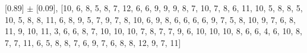 [0.89] $\pm$ [0.09], [10, 6, 8, 5, 8, 7, 12, 6, 6, 9, 9, 9, 8, 7, 10, 7, 8, 6, 11, 10, 5, 8, 8, 5, 10, 5, 8, 8, 11, 6, 8, 9, 5, 7, 9, 7, 8, 10, 6, 9, 8, 6, 6, 6, 6, 9, 7, 5, 8, 10, 9, 7, 6, 8, 11, 9, 10, 11, 3, 6, 6, 8, 7, 10, 10, 10, 7, 8, 7, 7, 9, 6, 10, 10, 10, 8, 6, 6, 4, 6, 10, 8, 7, 7, 11, 6, 5, 8, 8, 7, 6, 9, 7, 6, 8, 8, 12, 9, 7, 11]
